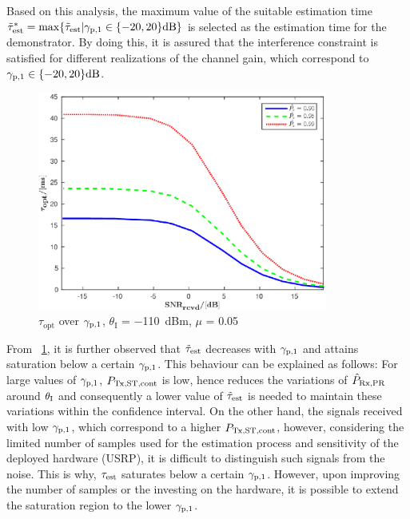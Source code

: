Based on this analysis, the maximum value of the suitable estimation time $\tilde{\tau}^*_{\text{est}} = \operatorname*{max}\{ \tilde{\tau}_{\text{est}} | {\gamma}_{\text{p,1}} \in \{-20,20 \}\SI{}{dB} \}$ is selected as the estimation time for the demonstrator.  
By doing this, it is assured that the interference constraint is satisfied for different realizations of the channel gain, which correspond to ${\gamma}_{\text{p,1}} \in \{-20,20\}\SI{}{dB}$. 
\begin{figure}
	\centering
	\includegraphics[width=0.85\textwidth]{figures/tau_snr}
	\caption{$\tau_\textrm{opt}$ over ${\gamma}_{\text{p,1}}$, $\theta_\textrm{I}$ = \SI{-110}{dBm}, $\mu$ = 0.05}
	\label{fig:Tausnr}
\end{figure}
From \figurename~\ref{fig:Tausnr}, it is further observed that $\tilde{\tau}_{\text{est}}$ decreases with ${\gamma}_{\text{p,1}}$ and attains saturation below a certain ${\gamma}_{\text{p,1}}$. %
This behaviour can be explained as follows: For large values of ${\gamma}_{\text{p,1}}$, $P_{\text{Tx,ST,cont}}$ is low, hence reduces the variations of $\hat{P}_{\text{Rx,PR}}$ around $\theta_{\text{I}}$ and consequently a lower value of $\tilde{\tau}_{\text{est}}$ is needed to maintain these variations within the confidence interval. On the other hand, the signals received with low ${\gamma}_{\text{p,1}}$, which correspond to a higher $P_{\text{Tx,ST,cont}}$, however, considering the limited number of samples used for the estimation process and sensitivity of the deployed hardware (USRP), it is difficult to distinguish such signals from the noise. This is why, $\tau_{\text{est}}$ saturates below a certain ${\gamma}_{\text{p,1}}$. However, upon improving the number of samples or the investing on the hardware, it is possible to extend the saturation region to the lower ${\gamma}_{\text{p,1}}$. 

